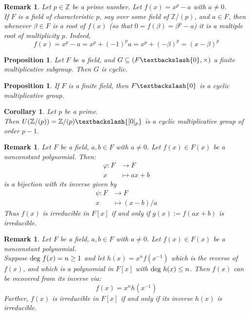 \documentclass[a4paper,8pt]{article}
\newcommand{\Z}{\mathbb{Z}}
\newcommand{\hlt}[1]{\textit{{\color{blue}#1}}}
\newcommand{\degs}[1]{\textnormal{deg}#1}
\theoremstyle{theorem}
\newtheorem{corollary}[theorem]{Corollary}
\newtheorem{proposition}[theorem]{Proposition}
\newtheorem{remark}[theorem]{Remark}
\begin{document}
\begin{remark}
Let $p \in \Z$ be a prime number. Let $f(x) = x^p - a$ with $a \neq 0$.\\
If $F$ is a field of characteristic $p$, say over some field of $\Z /(p)$, and $a \in F$, then whenever $\beta \in F$ is a root of $f(x)$ (so that $0=f(\beta) = \beta^p - a$) it is a multiple root of multiplicity $p$. Indeed,
\begin{equation}
f(x) = x^p - a = x^p + (-1)^p a = x^p + (-\beta)^p = (x-\beta)^p \nonumber
\end{equation}
\end{remark}

\begin{proposition}
Let $F$ be a field, and $G \subseteq (F \textbackslash \{0\}, \times)$ a finite multiplicative subgroup. Then $G$ is cyclic.
\end{proposition}

\begin{proposition}
If $F$ is a finite field, then $F\textbackslash \{0\}$ is a cyclic multiplicative group.
\end{proposition}

\begin{corollary}
Let $p$ be a prime.\\
Then $U(\Z /(p)) = \Z/(p) \textbackslash \{[0]_p\}$ is a cyclic multiplicative group of order $p-1$.
\end{corollary}

\begin{remark}
Let $F$ be a field, $a,b \in F$ with $a \neq 0$. Let $f(x) \in F(x)$ be a nonconstant polynomial. Then:\\
\begin{align}
\varphi: F &\rightarrow F \nonumber \\
x &\mapsto ax + b \nonumber
\end{align}
is a bijection with its inverse given by
\begin{align}
\psi: F &\rightarrow F \nonumber \\
x &\mapsto (x-b)/a \nonumber
\end{align}
Thus $f(x)$ is irreducible in $F[x]$ if and only if $g(x) := f(ax+b)$ is irreducible.
\end{remark}

\begin{remark}
Let $F$ be a field, $a,b \in F$ with $a \neq 0$. Let $f(x) \in F(x)$ be a nonconstant polynomial.\\
Suppose $\degs \ f(x) = n \geq 1$ and let $h(x) = x^n f(x^{-1})$ which is the \hlt{reverse of $f(x)$}, and which is a polynomial in $F[x]$ with $\degs \ h(x) \leq n$. Then $f(x)$ can be recovered from its inverse via:
\begin{equation}
f(x) = x^n h(x^{-1}) \nonumber
\end{equation}
Further, $f(x)$ is irreducible in $F[x]$ if and only if its inverse $h(x)$ is irreducible.
\end{remark}
\end{document}
